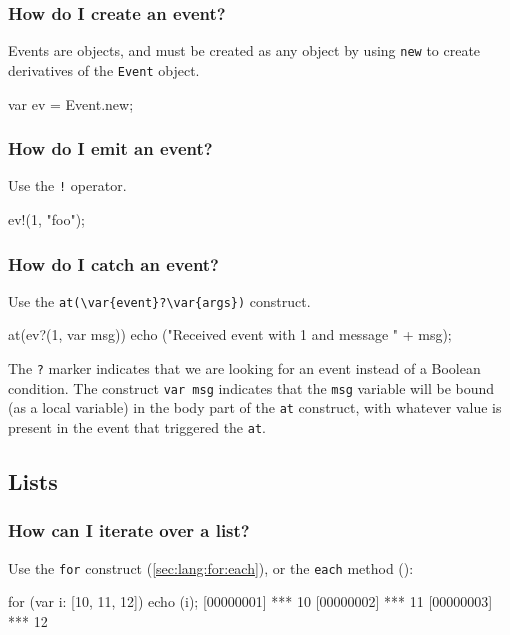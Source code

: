 \subsubsection{How do I create an event?}
Events are objects, and must be created as any object by using
\lstinline{new} to create derivatives of the \lstinline{Event} object.

\begin{urbiunchecked}
var ev = Event.new;
\end{urbiunchecked}

\subsubsection{How do I emit an event?}
Use the \lstinline|!| operator.

\begin{urbiunchecked}
ev!(1, "foo");
\end{urbiunchecked}

\subsubsection{How do I catch an event?}
Use the \lstinline|at(\var{event}?\var{args})| construct.

\begin{urbiunchecked}
at(ev?(1, var msg))
  echo ("Received event with 1 and message " + msg);
\end{urbiunchecked}

The \lstinline{?} marker indicates that we are looking for an event
instead of a Boolean condition. The construct \lstinline{var msg}
indicates that the \lstinline{msg} variable will be bound (as a local
variable) in the body part of the \lstinline{at} construct, with
whatever value is present in the event that triggered the
\lstinline{at}.

\subsection{Lists}
\subsubsection{How can I iterate over a list?}

Use the \lstinline{for} construct (\autoref{sec:lang:for:each}), or
the \lstinline|each| method ():

\begin{urbiscript}
for (var i: [10, 11, 12]) echo (i);
[00000001] *** 10
[00000002] *** 11
[00000003] *** 12
\end{urbiscript}


